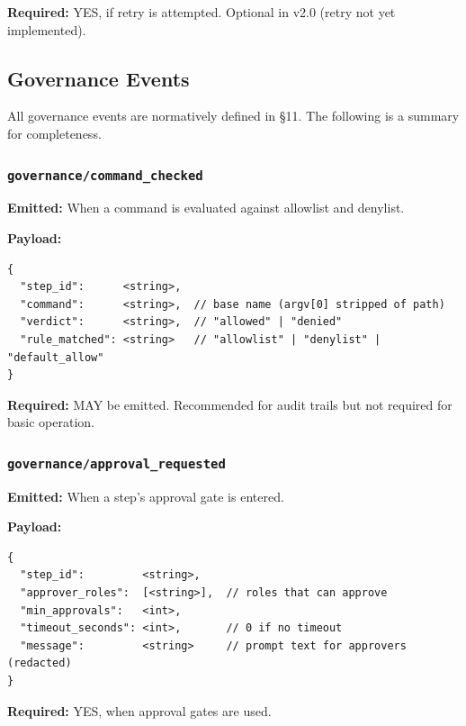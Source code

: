 \textbf{Required:} YES, if retry is attempted. Optional in v2.0 (retry not yet implemented).


\subsection{Governance Events}

All governance events are normatively defined in §11. The following is a summary for completeness.

\subsubsection{\texttt{governance/command\_checked}}

\textbf{Emitted:} When a command is evaluated against allowlist and denylist.

\textbf{Payload:}
\begin{verbatim}
{
  "step_id":      <string>,
  "command":      <string>,  // base name (argv[0] stripped of path)
  "verdict":      <string>,  // "allowed" | "denied"
  "rule_matched": <string>   // "allowlist" | "denylist" | "default_allow"
}
\end{verbatim}

\textbf{Required:} MAY be emitted. Recommended for audit trails but not required for basic operation.


\subsubsection{\texttt{governance/approval\_requested}}

\textbf{Emitted:} When a step's approval gate is entered.

\textbf{Payload:}
\begin{verbatim}
{
  "step_id":         <string>,
  "approver_roles":  [<string>],  // roles that can approve
  "min_approvals":   <int>,
  "timeout_seconds": <int>,       // 0 if no timeout
  "message":         <string>     // prompt text for approvers (redacted)
}
\end{verbatim}

\textbf{Required:} YES, when approval gates are used.


